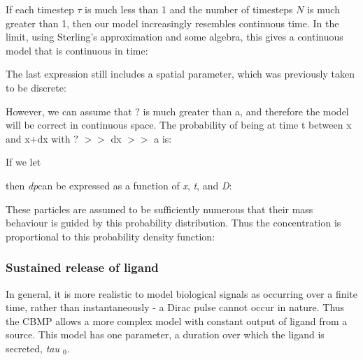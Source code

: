 \documentclass[11.5pt]{article}
\begin{document}
If each timestep \(\tau\) is much less than 1 and the number of 
timesteps \(N\) is much greater than 1, then our model increasingly 
resembles continuous time. In the limit, using Sterling's approximation 
and some algebra, this gives a continuous model that is continuous in 
time:





The last expression still includes a spatial parameter, which was 
previously taken to be discrete: 

\begin{figure}[H]
\centering
\end{figure}




However, we can assume that ? is much greater than a, and therefore the 
model will be correct in continuous space. The probability of being at 
time t between x and x+dx with ? $>$$>$ dx $>$$>$ a is:

\begin{figure}[H]
\centering
\end{figure}




If we let

\begin{figure}[H]
\centering
\end{figure}


then {\itshape dp}can be expressed as a function of {\itshape x}, 
{\itshape t}, and {\itshape D}:

\begin{figure}[H]
\centering
\end{figure}


These particles are assumed to be sufficiently numerous that their mass 
behaviour is guided by this probability distribution. Thus the 
concentration is proportional to this probability density function:

\begin{figure}[H]
\centering
\end{figure}


\subsubsection{Sustained release of 
ligand}
In general, it is more realistic to model biological signals as 
occurring over a finite time, rather than instantaneously - a Dirac 
pulse cannot occur in nature. Thus the CBMP allows a more complex model 
with constant output of ligand from a source. This model has one 
parameter, a duration over which the ligand is secreted, {\itshape tau
$_{0}$}.
\end{document}
